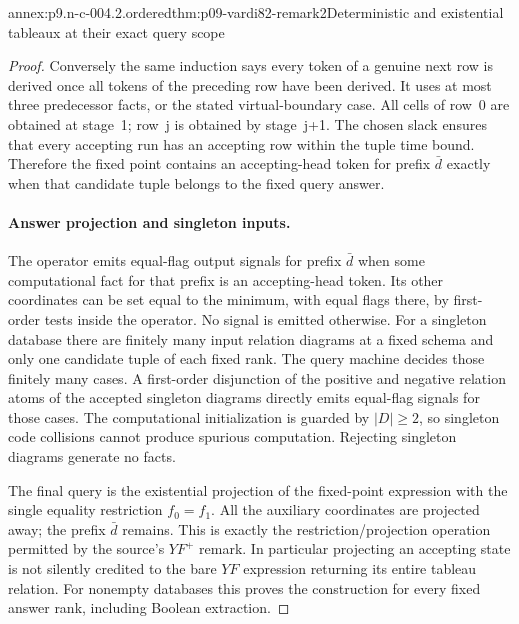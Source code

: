 \begin{annexitem}{annex:p9.n-c-004.2.ordered}{thm:p09-vardi82-remark2}{Deterministic and existential tableaux at their exact query scope}
\begin{proof}
Conversely the same induction says every token of a genuine next row is
derived once all tokens of the preceding row have been derived.  It uses at
most three predecessor facts, or the stated virtual-boundary case.  All
cells of row~0 are obtained at stage~1; row~j is obtained by stage~j+1.
The chosen slack ensures that every accepting run has an accepting row
within the tuple time bound.  Therefore the fixed point contains an
accepting-head token for prefix \(\bar d\) exactly when that candidate
tuple belongs to the fixed query answer.

\paragraph{Answer projection and singleton inputs.}
The operator emits equal-flag output signals for prefix \(\bar d\) when
some computational fact for that prefix is an accepting-head token.  Its
other coordinates can be set equal to the minimum, with equal flags there,
by first-order tests inside the operator.  No signal is emitted otherwise.
For a singleton database there are finitely many input relation diagrams
at a fixed schema and only one candidate tuple of each fixed rank.  The
query machine decides those finitely many cases.  A first-order disjunction
of the positive and negative relation atoms of the accepted singleton
diagrams directly emits equal-flag signals for those cases.  The
computational initialization is guarded by \(\lvert D\rvert\geq2\),
so singleton code collisions cannot produce spurious computation.  Rejecting
singleton diagrams generate no facts.

The final query is the existential projection of the fixed-point expression
with the single equality restriction \(f_0=f_1\).  All the auxiliary
coordinates are projected away; the prefix \(\bar d\) remains.  This is
exactly the restriction/projection operation permitted by the source's
\(YF^+\) remark.  In particular projecting an accepting state is not
silently credited to the bare \(YF\) expression returning its entire
tableau relation.  For nonempty databases this proves the construction for
every fixed answer rank, including Boolean extraction.


\end{proof}
\end{annexitem}
